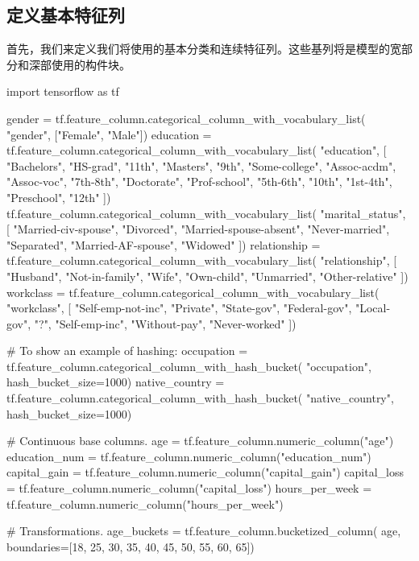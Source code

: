 \subsection{定义基本特征列}
首先，我们来定义我们将使用的基本分类和连续特征列。这些基列将是模型的宽部分和深部使用的构件块。
\begin{python}
import tensorflow as tf

gender = tf.feature_column.categorical_column_with_vocabulary_list(
    "gender", ["Female", "Male"])
education = tf.feature_column.categorical_column_with_vocabulary_list(
    "education", [
        "Bachelors", "HS-grad", "11th", "Masters", "9th",
        "Some-college", "Assoc-acdm", "Assoc-voc", "7th-8th",
        "Doctorate", "Prof-school", "5th-6th", "10th", "1st-4th",
        "Preschool", "12th"
    ])
tf.feature_column.categorical_column_with_vocabulary_list(
    "marital_status", [
        "Married-civ-spouse", "Divorced", "Married-spouse-absent",
        "Never-married", "Separated", "Married-AF-spouse", "Widowed"
    ])
relationship = tf.feature_column.categorical_column_with_vocabulary_list(
    "relationship", [
        "Husband", "Not-in-family", "Wife", "Own-child", "Unmarried",
        "Other-relative"
    ])
workclass = tf.feature_column.categorical_column_with_vocabulary_list(
    "workclass", [
        "Self-emp-not-inc", "Private", "State-gov", "Federal-gov",
        "Local-gov", "?", "Self-emp-inc", "Without-pay", "Never-worked"
    ])

# To show an example of hashing:
occupation = tf.feature_column.categorical_column_with_hash_bucket(
    "occupation", hash_bucket_size=1000)
native_country = tf.feature_column.categorical_column_with_hash_bucket(
    "native_country", hash_bucket_size=1000)

# Continuous base columns.
age = tf.feature_column.numeric_column("age")
education_num = tf.feature_column.numeric_column("education_num")
capital_gain = tf.feature_column.numeric_column("capital_gain")
capital_loss = tf.feature_column.numeric_column("capital_loss")
hours_per_week = tf.feature_column.numeric_column("hours_per_week")

# Transformations.
age_buckets = tf.feature_column.bucketized_column(
    age, boundaries=[18, 25, 30, 35, 40, 45, 50, 55, 60, 65])
\end{python}
